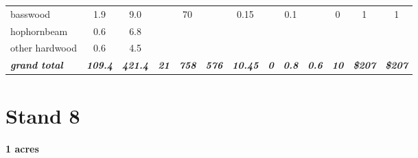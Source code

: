 \documentclass[landscape]{article}
\begin{document}
\begin{table}[H]
\begin{tabular}[t]{lcccccccccccc}
\rowcolor{gray!6}  basswood & 1.9 & 9.0 &  & 70 &  & 0.15 &  & 0.1 &  & 0 & 1 & 1\\
 
hophornbeam & 0.6 & 6.8 &  &  &  &  &  &  &  &  &  & \\
 
\rowcolor{gray!6}  other hardwood & 0.6 & 4.5 &  &  &  &  &  &  &  &  &  & \\
 
\rowcolor[HTML]{DCDCDC}  \em{\textbf{grand total}} & \em{\textbf{109.4}} & \em{\textbf{421.4}} & \em{\textbf{21}} & \em{\textbf{758}} & \em{\textbf{576}} & \em{\textbf{10.45}} & \em{\textbf{0}} & \em{\textbf{0.8}} & \em{\textbf{0.6}} & \em{\textbf{10}} & \em{\textbf{\$207}} & \em{\textbf{\$207}}\\
\bottomrule
\end{tabular}
\end{table}

\pagebreak

\section{Stand 8}\label{stand-8}

\textbf{1 acres}
\end{document}
